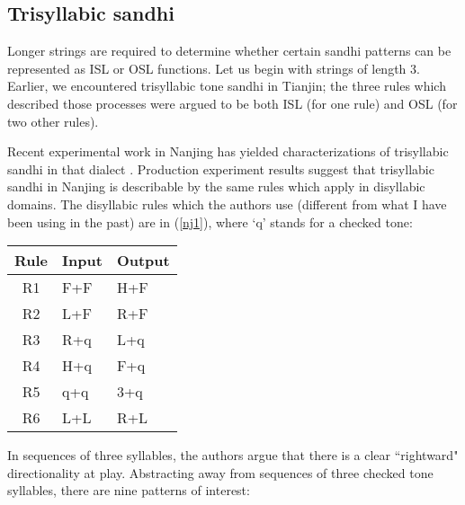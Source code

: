 \documentclass{article}
\begin{document}
\subsection{Trisyllabic sandhi}
 Longer strings are required to determine whether certain sandhi patterns can be represented as ISL or OSL functions. Let us begin with strings of length 3. Earlier, we encountered trisyllabic tone sandhi in Tianjin; the three rules which described those processes were argued to be both ISL (for one rule) and OSL (for two other rules). \par
Recent experimental work in Nanjing has yielded characterizations of trisyllabic sandhi in that dialect \cite{Maandli2014}. Production experiment results suggest that trisyllabic sandhi in Nanjing is describable by the same rules which apply in disyllabic domains. The disyllabic rules which the authors use (different from what I have been using in the past) are in (\ref{nj1}), where `q' stands for a checked tone:
\begin{exe}
\ex \label{nj1}
\renewcommand{\arraystretch}{1.5}
\begin{tabular}[t]{|c|l|l|}
\hline
Rule & Input & Output \\
\hline
R1 & F+F & H+F \\
\hline
R2 & L+F & R+F \\
\hline
R3 & R+q & L+q \\
\hline
R4 & H+q & F+q \\
\hline
R5 & q+q & 3+q \\
\hline
R6 & L+L & R+L \\
\hline
\end{tabular}
\end{exe}
In sequences of three syllables, the authors argue that there is a clear ``rightward" directionality at play. Abstracting away from sequences of three checked tone syllables, there are nine patterns of interest:
\end{document}
